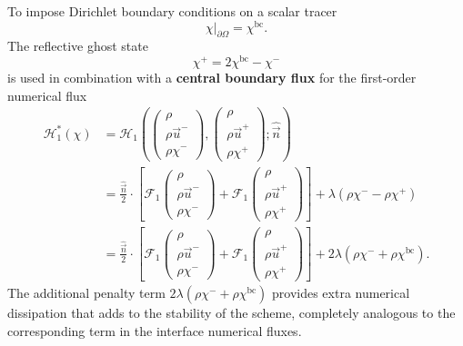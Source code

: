 \documentclass{report}
\numberwithin{equation}{section}
\begin{document}
To impose Dirichlet boundary conditions on a scalar tracer 
\begin{equation}
    \chi\bigg|_{\partial \Omega} = \chi^{\text{bc}}.
\end{equation} 
The reflective ghost state
\begin{equation}
    \chi^+ = 2\chi^{\text{bc}} - \chi^-
\end{equation}
is used in combination with a \textbf{central boundary flux} for the first-order numerical flux
\begin{align}
    \mathcal{H}_1^*(\chi) & = \mathcal{H}_1 \left(
        \begin{pmatrix} \rho \\ \rho \vec u^- \\ \rho \chi^- \end{pmatrix},
        \begin{pmatrix} \rho \\ \rho \vec u^+ \\ \rho \chi^+ \end{pmatrix}; 
    \hat{\vec n } \right) \nonumber \\
    & = \frac{\hat{\vec n }}{2} \cdot \left[
        \mathcal{F}_1 \begin{pmatrix} \rho \\ \rho \vec u^- \\ \rho \chi^- \end{pmatrix} 
        + \mathcal{F}_1 \begin{pmatrix} \rho \\ \rho \vec u^+ \\ \rho \chi^+ \end{pmatrix} 
    \right] + \lambda (\rho \chi^- - \rho \chi^+) \nonumber \\
    & = \frac{\hat{\vec n }}{2} \cdot \left[
        \mathcal{F}_1 \begin{pmatrix} \rho \\ \rho \vec u^- \\ \rho \chi^- \end{pmatrix} 
        + \mathcal{F}_1 \begin{pmatrix} \rho \\ \rho \vec u^+ \\ \rho \chi^+ \end{pmatrix} 
    \right] + 2 \lambda (\rho \chi^- + \rho \chi^{\text{bc}}).
\end{align}
The additional penalty term $2 \lambda (\rho \chi^- + \rho \chi^{\text{bc}})$ provides extra numerical dissipation that adds to the stability of the scheme, completely analogous to the corresponding term in the interface numerical fluxes.
\end{document}
